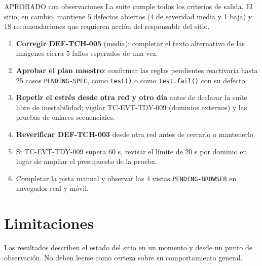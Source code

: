 \documentclass[11pt,a4paper]{article}
\newcommand{\code}[1]{\texttt{#1}}
\begin{document}
\begin{verdictbox}{APROBADO con observaciones}
La suite cumple todos los criterios de salida. El sitio, en cambio, mantiene 5 defectos abiertos (4 de severidad media y 1 baja) y 18 recomendaciones que requieren acción del responsable del sitio.
\end{verdictbox}

\begin{enumerate}
  \item \textbf{Corregir DEF-TCH-005} (media): completar el texto alternativo de las imágenes cierra 5 fallos esperados de una vez.
  \item \textbf{Aprobar el plan maestro}: confirmar las reglas pendientes reactivaría hasta 25 casos \code{PENDING-SPEC}, como \code{test()} o como \code{test.fail()} con su defecto.
  \item \textbf{Repetir el estrés desde otra red y otro día} antes de declarar la suite libre de inestabilidad; vigilar TC-EVT-TDY-009 (dominios externos) y las pruebas de enlaces secuenciales.
  \item \textbf{Reverificar DEF-TCH-003} desde otra red antes de cerrarlo o mantenerlo.
  \item Si TC-EVT-TDY-009 supera 60 s, revisar el límite de 20 s por dominio en lugar de ampliar el presupuesto de la prueba.
  \item Completar la pista manual y observar las 4 vistas \code{PENDING-BROWSER} en navegador real y móvil.
\end{enumerate}

\section{Limitaciones}

\begin{warnbox}
Los resultados describen el estado del sitio en un momento y desde un punto de observación. No deben leerse como certeza sobre su comportamiento general.
\end{warnbox}
\end{document}
